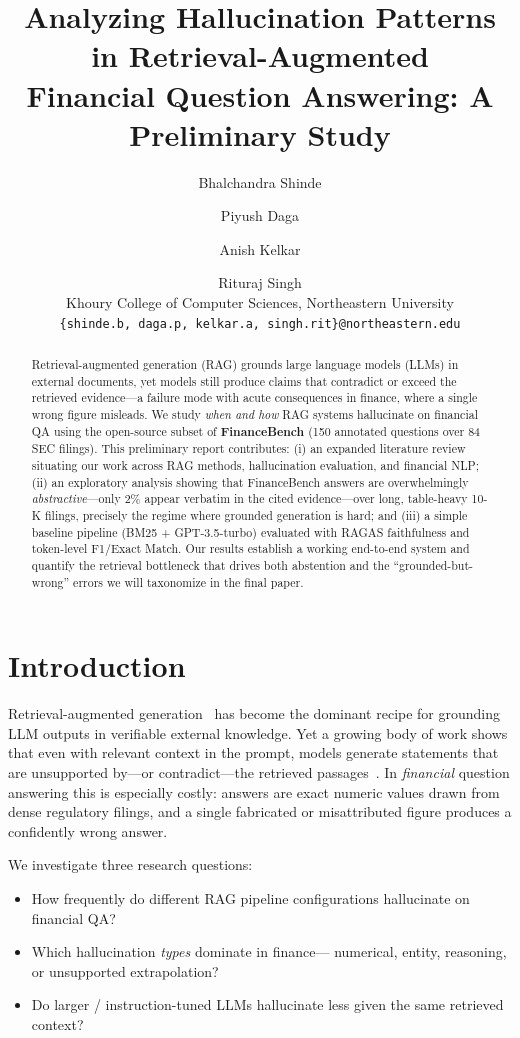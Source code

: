 \documentclass[11pt]{article}
\title{Analyzing Hallucination Patterns in Retrieval-Augmented\\
Financial Question Answering: A Preliminary Study}
\author{
  Bhalchandra Shinde \and Piyush Daga \and Anish Kelkar \and Rituraj Singh \\
  Khoury College of Computer Sciences, Northeastern University \\
  \texttt{\{shinde.b, daga.p, kelkar.a, singh.rit\}@northeastern.edu}
}
\begin{document}
\maketitle

\begin{abstract}
Retrieval-augmented generation (RAG) grounds large language models (LLMs) in
external documents, yet models still produce claims that contradict or exceed
the retrieved evidence---a failure mode with acute consequences in finance,
where a single wrong figure misleads. We study \emph{when and how} RAG systems
hallucinate on financial QA using the open-source subset of
\textbf{FinanceBench} (150 annotated questions over 84 SEC filings). This
preliminary report contributes: (i) an expanded literature review situating our
work across RAG methods, hallucination evaluation, and financial NLP; (ii) an
exploratory analysis showing that FinanceBench answers are overwhelmingly
\emph{abstractive}---only 2\% appear verbatim in the cited evidence---over long,
table-heavy 10-K filings, precisely the regime where grounded generation is
hard; and (iii) a simple baseline pipeline (BM25 + GPT-3.5-turbo) evaluated with
RAGAS faithfulness and token-level F1/Exact Match. Our results establish a
working end-to-end system and quantify the retrieval bottleneck that drives both
abstention and the ``grounded-but-wrong'' errors we will taxonomize in the final
paper.
\end{abstract}

\section{Introduction}
Retrieval-augmented generation~\citep{lewis2020rag} has become the dominant
recipe for grounding LLM outputs in verifiable external knowledge. Yet a growing
body of work shows that even with relevant context in the prompt, models
generate statements that are unsupported by---or contradict---the retrieved
passages~\citep{ji2023hallucination,huang2023hallucinationsurvey}. In
\emph{financial} question answering this is especially costly: answers are exact
numeric values drawn from dense regulatory filings, and a single fabricated or
misattributed figure produces a confidently wrong answer.

We investigate three research questions:
\begin{itemize}
  \item[\textbf{RQ1}] How frequently do different RAG pipeline configurations
  hallucinate on financial QA?
  \item[\textbf{RQ2}] Which hallucination \emph{types} dominate in finance---
  numerical, entity, reasoning, or unsupported extrapolation?
  \item[\textbf{RQ3}] Do larger / instruction-tuned LLMs hallucinate less given
  the same retrieved context?
\end{itemize}
\end{document}
